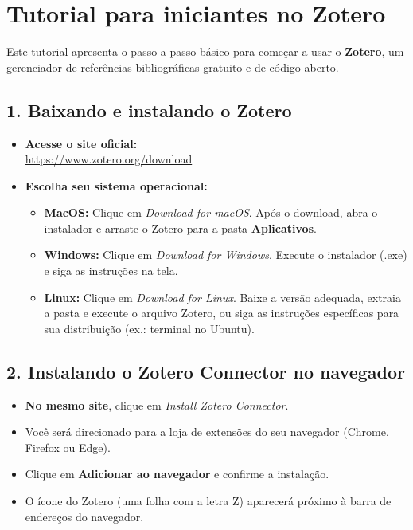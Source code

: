 \documentclass[
  letterpaper,
  DIV=11,
  numbers=noendperiod]{scrreprt}
\providecommand{\tightlist}{%
  \setlength{\itemsep}{0pt}\setlength{\parskip}{0pt}}
\begin{document}
\chapter{Tutorial para iniciantes no
Zotero}\label{tutorial-para-iniciantes-no-zotero}

Este tutorial apresenta o passo a passo básico para começar a usar o
\textbf{Zotero}, um gerenciador de referências bibliográficas gratuito e
de código aberto.

\section{1. Baixando e instalando o
Zotero}\label{baixando-e-instalando-o-zotero}

\begin{itemize}
\item
  \textbf{Acesse o site oficial:}\\
  \url{https://www.zotero.org/download}
\item
  \textbf{Escolha seu sistema operacional:}

  \begin{itemize}
  \tightlist
  \item
    \textbf{MacOS:} Clique em \emph{Download for macOS}. Após o
    download, abra o instalador e arraste o Zotero para a pasta
    \textbf{Aplicativos}.
  \item
    \textbf{Windows:} Clique em \emph{Download for Windows}. Execute o
    instalador (.exe) e siga as instruções na tela.
  \item
    \textbf{Linux:} Clique em \emph{Download for Linux}. Baixe a versão
    adequada, extraia a pasta e execute o arquivo Zotero, ou siga as
    instruções específicas para sua distribuição (ex.: terminal no
    Ubuntu).
  \end{itemize}
\end{itemize}

\section{2. Instalando o Zotero Connector no
navegador}\label{instalando-o-zotero-connector-no-navegador}

\begin{itemize}
\tightlist
\item
  \textbf{No mesmo site}, clique em \emph{Install Zotero Connector}.
\item
  Você será direcionado para a loja de extensões do seu navegador
  (Chrome, Firefox ou Edge).
\item
  Clique em \textbf{Adicionar ao navegador} e confirme a instalação.
\item
  O ícone do Zotero (uma folha com a letra Z) aparecerá próximo à barra
  de endereços do navegador.
\end{itemize}
\end{document}

